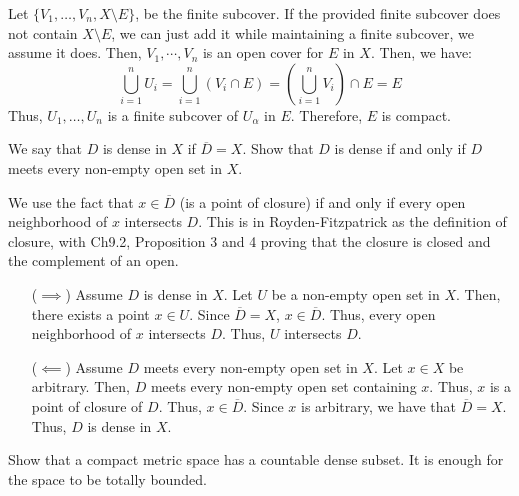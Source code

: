 \documentclass[12pt]{article}
\begin{document}
\begin{solution}
\begin{enumerate}
        Let $\{V_{1}, \ldots, V_{n}, X \setminus E\}$, be the finite subcover. If the provided finite subcover does not contain $X \setminus E$, we can just add it while maintaining a finite subcover, we assume it does. Then, $V_1, \cdots, V_n$ is an open cover for $E$ in $X$. Then, we have:
        \[ \bigcup_{i=1}^n U_i = \bigcup_{i=1}^n (V_i \cap E) = \left(\bigcup_{i=1}^n V_i\right) \cap E = E \]
        Thus, $U_1, \ldots, U_n$ is a finite subcover of $U_\alpha$ in $E$. Therefore, $E$ is compact.
    \end{enumerate}
\end{solution}

\newpage

\begin{problem}{3}
    We say that $D$ is dense in $X$ if $\overline{D} = X$. Show that $D$ is dense if and only if $D$ meets every non-empty open set in $X$. 
\end{problem}

\begin{solution}
    We use the fact that $x \in \overline{D}$ (is a point of closure) if and only if every open neighborhood of $x$ intersects $D$. This is in Royden-Fitzpatrick as the definition of closure, with Ch9.2, Proposition 3 and 4 proving that the closure is closed and the complement of an open.
    \begin{itemize}
        \item[($\implies$)] Assume $D$ is dense in $X$. Let $U$ be a non-empty open set in $X$. Then, there exists a point $x \in U$. Since $\overline{D} = X$, $x \in \overline{D}$. Thus, every open neighborhood of $x$ intersects $D$. Thus, $U$ intersects $D$.
        \item[($\impliedby$)] Assume $D$ meets every non-empty open set in $X$. Let $x \in X$ be arbitrary. Then, $D$ meets every non-empty open set containing $x$. Thus, $x$ is a point of closure of $D$. Thus, $x \in \overline{D}$. Since $x$ is arbitrary, we have that $\overline{D} = X$. Thus, $D$ is dense in $X$.
    \end{itemize}
\end{solution}
\newpage


\begin{problem}{4}
    Show that a compact metric space has a countable dense subset. It is enough for the space to be totally bounded.
\end{problem}
\end{document}
